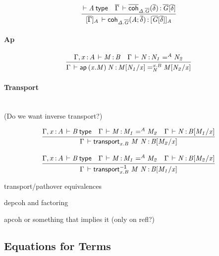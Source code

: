 \begin{small}
\[
\begin{array}{l}
\infer
  {\oftp{\interpdiag{\diag\Gamma}{A}}
        {\coh{\Delta.\diag G}{A}{\diag\delta}}
        {\interpdiag{\diag G[\diag\delta]}{A}}}
  {\wftp{}{A}
  &\oftp{\diag\Gamma}{\diagcoh{\Delta.\diag G}{\diag\delta}}{\diag
    G[\diag\delta]}}
\end{array}
\]
\end{small}


\paragraph{Ap}
\begin{small}
\[
\begin{array}{l}
\infer{\oftp{\Gamma}{\ap{(x.M)}{N}}{\iidover{x.B}{N}{\subst{M}{N_1}{x}}{\subst{M}{N_2}{x}}}}
      {\oftp{\Gamma,\tptm{x}{A}}{M}{B} & \oftp{\Gamma}{N}{\iid{A}{N_1}{N_2}}}
\end{array}
\]
\end{small}

\paragraph{Transport}

\ \\
(Do we want inverse transport?)

\begin{small}
\[
\begin{array}{l}
\infer{\oftp{\Gamma}{\transport{x.B}{M}{N}}{\subst{B}{M_2}{x}}}
      {\wftp{\Gamma,\tptm{x}{A}}{B} &
       \oftp{\Gamma}{M}{\iid{A}{M_1}{M_2}} &
       \oftp{\Gamma}{N}{\subst{B}{M_1}{x}}}
\\ \\
\infer{\oftp{\Gamma}{\transportinv{x.B}{M}{N}}{\subst{B}{M_1}{x}}}
      {\wftp{\Gamma,\tptm{x}{A}}{B} &
       \oftp{\Gamma}{M}{\iid{A}{M_1}{M_2}} &
       \oftp{\Gamma}{N}{\subst{B}{M_2}{x}}}
\end{array}
\]
\end{small}

transport/pathover equivalences

depcoh and factoring

apcoh or something that implies it (only on refl?)

\subsection{Equations for Terms}

